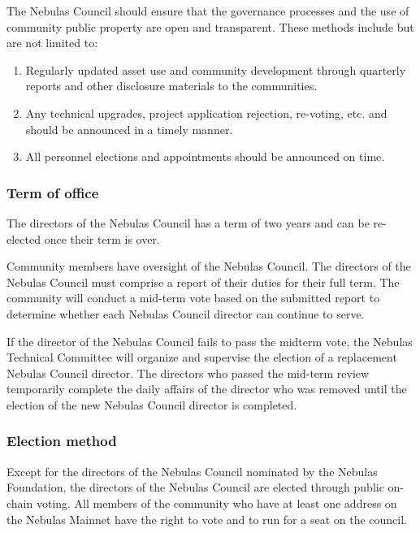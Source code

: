 The Nebulas Council should ensure that the governance processes and the use of community public property are open and transparent. These methods include but are not limited to:

\begin{enumerate}
	\item Regularly updated asset use and community development through quarterly reports and other disclosure materials to the communities.
	\item Any technical upgrades, project application rejection, re-voting, etc. and should be announced in a timely manner.
	\item All personnel elections and appointments should be announced on time.
\end{enumerate}

\subsubsection{Term of office}

The directors of the Nebulas Council has a term of two years and can be re-elected once their term is over.

\vspace{2em}


Community members have oversight of the Nebulas Council. The directors of the Nebulas Council must comprise a report of their duties for their full term. The community will conduct a mid-term vote based on the submitted report to determine whether each Nebulas Council director can continue to serve.

If the director of the Nebulas Council fails to pass the midterm vote, the Nebulas Technical Committee will organize and supervise the election of a replacement Nebulas Council director. The directors who passed the mid-term review temporarily complete the daily affairs of the director who was removed until the election of the new Nebulas Council director is completed.

\subsubsection{Election method}

Except for the directors of the Nebulas Council nominated by the Nebulas Foundation, the directors of the Nebulas Council are elected through public on-chain voting. All members of the community who have at least one address on the Nebulas Mainnet have the right to vote and to run for a seat on the council.

